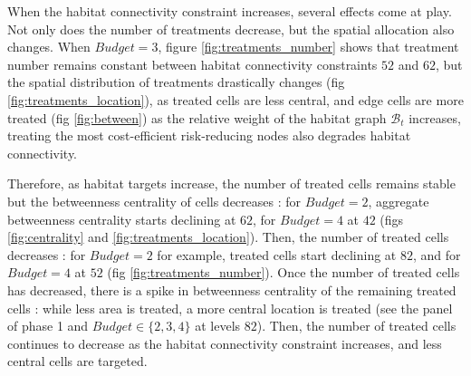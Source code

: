 When the habitat connectivity constraint increases, several effects come at play. Not only does the number of treatments decrease, but the spatial allocation also changes. When $Budget=3$, figure \ref{fig:treatments_number} shows that treatment number remains constant between habitat connectivity constraints $52$ and $62$, but the spatial distribution of treatments drastically changes (fig \ref{fig:treatments_location}), as treated cells are less central, and edge cells are more treated (fig \ref{fig:between}) as the relative weight of the habitat graph $\mathcal{B}_t$ increases, treating the most cost-efficient risk-reducing nodes also degrades habitat connectivity.

Therefore, as habitat targets increase, the number of treated cells remains stable but the betweenness centrality of cells decreases : for $Budget=2$, aggregate betweenness centrality starts declining at $62$, for $Budget=4$ at $42$ (figs \ref{fig:centrality} and \ref{fig:treatments_location}). Then, the number of treated cells decreases : for $Budget=2$ for example, treated cells start declining at $82$, and for $Budget=4$ at $52$ (fig \ref{fig:treatments_number}). Once the number of treated cells has decreased, there is a spike in betweenness centrality of the remaining treated cells : while less area is treated, a more central location is treated (see the panel of phase 1 and $Budget \in \{2,3,4\}$ at levels $82$). Then, the number of treated cells continues to decrease as the habitat connectivity constraint increases, and less central cells are targeted. 

